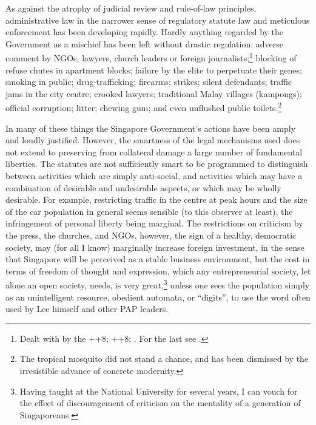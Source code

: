 As against the atrophy of judicial review and rule-of-law
principles, administrative law in the narrower sense of
regulatory statute law and meticulous enforcement has been
developing rapidly.  Hardly anything regarded by the Government
as a mischief has been left without drastic regulation: adverse
comment by NGOs, lawyers, church leaders or foreign
journalists;\footnote{ Dealt with by the
  ++{{8}};
  ++{{8}};
  . For the last see
  .  } blocking of refuse chutes
in apartment blocks; failure by the elite to perpetuate their
genes; smoking in public; drug-trafficking; firearms; strikes;
silent defendants; traffic jams in the city centre; crooked
lawyers; traditional Malay villages (kampongs); official
corruption; litter; chewing gum; and even unflushed public
toilets.\footnote{ The tropical mosquito did not stand a chance,
  and has been dismissed by the irresistible advance of concrete
  modernity.}


In many of these things the Singapore Government's actions have
been amply and loudly justified. However, the smartness of the
legal mechanisms used does not extend to preserving from
collateral damage a large number of fundamental liberties. The
statutes are not sufficiently smart to be programmed to
distinguish between activities which are simply anti-social, and
activities which may have a combination of desirable and
undesirable aspects, or which may be wholly desirable. For
example, restricting traffic in the centre at peak hours and the
size of the car population in general seems sensible (to this
observer at least), the infringement of personal liberty being
marginal. The restrictions on criticism by the press, the
churches, and NGOs, however, the sign of a healthy, democratic
society, may (for all I know) marginally increase foreign
investment, in the sense that Singapore will be perceived as a
stable business environment, but the cost in terms of freedom of
thought and expression, which any entrepreneurial society, let
alone an open society, needs, is very great,\footnote{ Having
  taught at the National University for several years, I can
  vouch for the effect of discouragement of criticism on the
  mentality of a generation of Singaporeans.} unless one sees the
population simply as an unintelligent resource, obedient
automata, or ``digits'', to use the word often used by Lee
himself and other PAP leaders.

